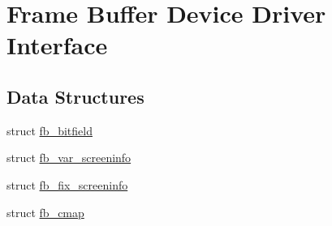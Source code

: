 \hypertarget{group__libmisc__fb}{}\section{Frame Buffer Device Driver Interface}
\label{group__libmisc__fb}
\subsection*{Data Structures}
\begin{DoxyCompactItemize}
\item 
struct \mbox{\hyperlink{structfb__bitfield}{fb\+\_\+bitfield}}
\item 
struct \mbox{\hyperlink{structfb__var__screeninfo}{fb\+\_\+var\+\_\+screeninfo}}
\item 
struct \mbox{\hyperlink{structfb__fix__screeninfo}{fb\+\_\+fix\+\_\+screeninfo}}
\item 
struct \mbox{\hyperlink{structfb__cmap}{fb\+\_\+cmap}}
\end{DoxyCompactItemize}
